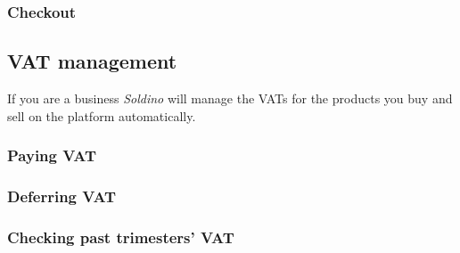 	\subsubsection{Checkout}
	\subsection{VAT management}
	If you are a business \textit{Soldino} will manage the VATs for the products 
	you buy and sell on the platform automatically.
		\subsubsection{Paying VAT}
	
		\subsubsection{Deferring VAT}
		
		\subsubsection{Checking past trimesters' VAT}
		